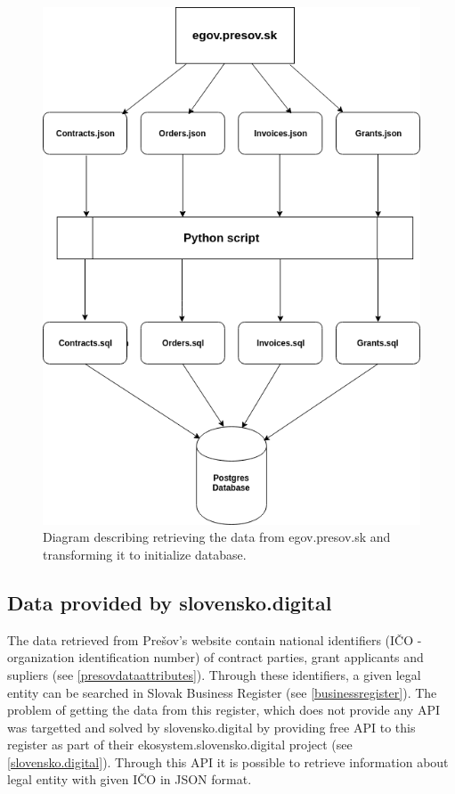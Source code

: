 \documentclass[thesis=B,english]{FITthesis}[2012/06/26]
\begin{document}
\begin{figure}[h!]
  \begin{center}
  \includegraphics[scale=0.6]{pictures/jsonToDb.png}
  \caption{Diagram describing retrieving the data from egov.presov.sk and transforming it to initialize database.}
  \label{fig:jsonToDb}
  \end{center}
\end{figure}
	\subsection{Data provided by slovensko.digital}
	The data retrieved from Prešov's website contain national identifiers (IČO - organization identification number) of contract parties, grant applicants and supliers (see \ref{presovdataattributes}). Through these identifiers, a given legal entity can be searched in Slovak Business Register (see \ref{businessregister}). The problem of getting the data from this register, which does not provide any API was targetted and solved by slovensko.digital by providing free API to this register as part of their ekosystem.slovensko.digital project (see \ref{slovensko.digital}). Through this API it is possible to retrieve information about legal entity with given IČO in JSON format. 
	
\end{document}
